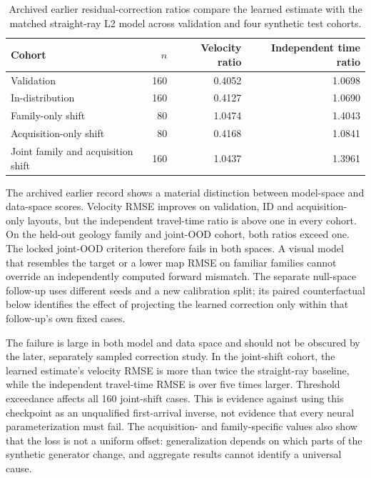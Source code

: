 \documentclass[11pt]{article}
\begin{document}
\begin{table}[htbp]
\centering
\caption{Archived earlier residual-correction ratios compare the learned estimate with the matched straight-ray L2 model across validation and four synthetic test cohorts.}
\label{tab:cnn-failure}
\small
\begin{tabular}{lrrr}
\toprule
Cohort & $n$ & Velocity ratio & Independent time ratio \\
\midrule
Validation & 160 & 0.4052 & 1.0698 \\
In-distribution & 160 & 0.4127 & 1.0690 \\
Family-only shift & 80 & 1.0474 & 1.4043 \\
Acquisition-only shift & 80 & 0.4168 & 1.0841 \\
Joint family and acquisition shift & 160 & 1.0437 & 1.3961 \\
\bottomrule
\end{tabular}
\end{table}

The archived earlier record shows a material distinction between model-space and data-space scores. Velocity RMSE improves on validation, ID and acquisition-only layouts, but the independent travel-time ratio is above one in every cohort. On the held-out geology family and joint-OOD cohort, both ratios exceed one. The locked joint-OOD criterion therefore fails in both spaces. A visual model that resembles the target or a lower map RMSE on familiar families cannot override an independently computed forward mismatch. The separate null-space follow-up uses different seeds and a new calibration split; its paired counterfactual below identifies the effect of projecting the learned correction only within that follow-up's own fixed cases.

The failure is large in both model and data space and should not be obscured by the later, separately sampled correction study. In the joint-shift cohort, the learned estimate's velocity RMSE is more than twice the straight-ray baseline, while the independent travel-time RMSE is over five times larger. Threshold exceedance affects all 160 joint-shift cases. This is evidence against using this checkpoint as an unqualified first-arrival inverse, not evidence that every neural parameterization must fail. The acquisition- and family-specific values also show that the loss is not a uniform offset: generalization depends on which parts of the synthetic generator change, and aggregate results cannot identify a universal cause.
\end{document}

